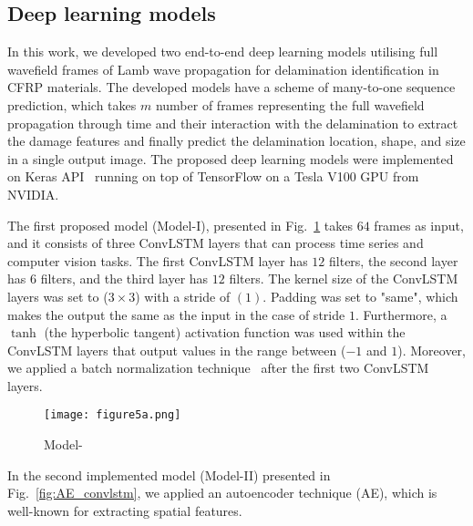 \subsection{Deep learning models}
\label{proposed_approach}
\begin{sloppypar}
	In this work, we developed two end-to-end deep learning models utilising full wavefield frames of Lamb wave propagation for delamination identification in CFRP materials.
	The developed models have a scheme of many-to-one sequence prediction, which takes \(m\) number of frames representing the full wavefield propagation through time and their interaction with the delamination to extract the damage features and finally predict the delamination location, shape, and size in a single output image.
	The proposed deep learning models were implemented on Keras API~\cite{chollet2015keras} running on top of TensorFlow on a Tesla V100 GPU from NVIDIA.
	
	The first proposed model (Model-I), presented in Fig.~\ref{fig:convlstm_model} takes \(64\) frames as input, and it consists of three ConvLSTM layers that can process time series and computer vision tasks.
	The first ConvLSTM layer has \(12\) filters, the second layer has \(6\) filters, and the third layer has \(12\) filters.
	The kernel size of the ConvLSTM layers was set to (\(3\times3\)) with a stride of \((1)\). 
	Padding was set to "same", which makes the output the same as the input in the case of stride \(1\).
	Furthermore, a \(\tanh\) (the hyperbolic tangent) activation function was used within the ConvLSTM layers that output values in the range between (\(-1\) and \(1\)).
	Moreover, we applied a batch normalization technique~\cite{Santurkar2018} after the first two ConvLSTM layers.
	\begin{figure} [!ht]
		\centering
			\centering
			\texttt{[image: figure5a.png]}
			\caption{Model-} %
			\label{fig:convlstm_model}
	\end{figure}

	In the second implemented model (Model-II) presented in Fig.~\ref{fig:AE_convlstm}, we applied an autoencoder technique (AE), which is well-known for extracting spatial features.
	

\end{sloppypar}
